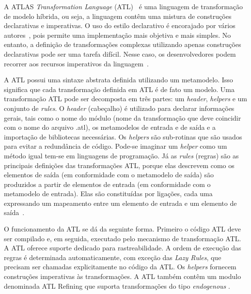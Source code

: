 A ATLAS \emph{Transformation Language} (ATL)~\cite{ATL_eclipse} é uma linguagem de transformação de modelo híbrida, ou seja, a linguagem contêm uma mistura de construções declarativas e imperativas. O uso do estilo declarativo é encorajado por vários autores~\cite{Allilaire_06, Jouault_2005, Jouault_2008}, pois permite uma implementação mais objetiva e mais simples. No entanto, a definição de transformações complexas utilizando apenas construções declarativas pode ser uma tarefa difícil. Nesse caso, os desenvolvedores podem recorrer aos recursos imperativos da linguagem~\cite{Allilaire_06}.

A ATL possui uma sintaxe abstrata definida utilizando um metamodelo. Isso significa que cada transformação definida em ATL é de fato um modelo. Uma transformação ATL pode ser decomposta em três partes: um \textit{header}, \textit{helpers} e um conjunto de \textit{rules}. O \textit{header} (cabeçalho) é utilizado para declarar informações gerais, tais como o nome do módulo (nome da transformação que deve coincidir com o nome do arquivo .atl), os metamodelos de entrada e de saída  e a importação de bibliotecas necessárias. Os \textit{helpers} são sub-rotinas que são usados para evitar a redundância de código. Pode-se imaginar um \textit{helper} como um método igual tem-se em linguagens de programação. Já as \textit{rules} (regras) são as principais definições das transformações ATL, porque elas descrevem como os elementos de saída (em conformidade com o metamodelo de saída) são produzidos a partir de elementos de entrada (em conformidade com o metamodelo de entrada). Elas são constituídas por ligações, cada uma expressando um mapeamento entre um elemento de entrada e um elemento de saída~\cite{ATL_eclipse}.

O funcionamento da ATL se dá da seguinte forma. Primeiro o código ATL deve ser compilado e, em seguida, executado pelo mecanismo de transformação ATL. A ATL oferece suporte dedicado para rastreabilidade. A ordem de execução das regras é determinada automaticamente, com exceção das \textit{Lazy Rules}, que precisam ser chamadas explicitamente no código da ATL. Os \textit{helpers} fornecem construções imperativas às transformações. A ATL também contêm um modulo denominada ATL Refining que suporta transformações do tipo \emph{endogenous} .

